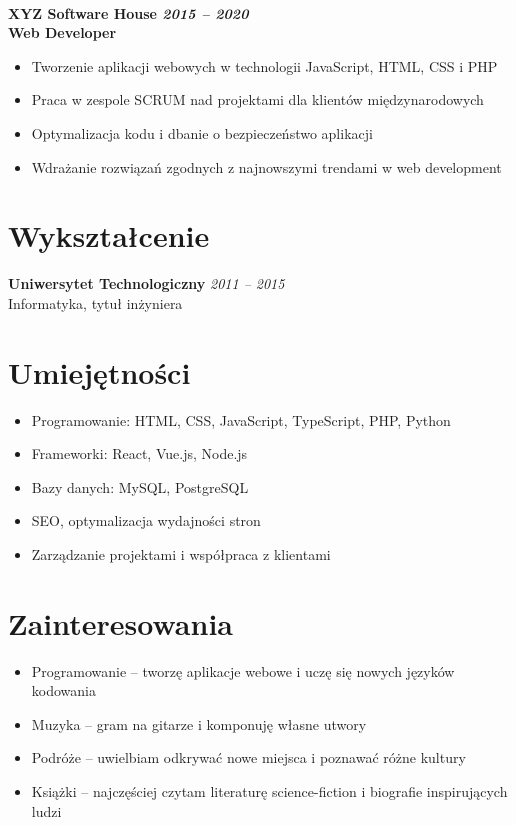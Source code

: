 \documentclass[a4paper,10pt]{article}
\begin{document}
 \\
\bf{XYZ Software House} \hfill \textit{2015 – 2020}\\
Web Developer
\begin{itemize}
    \item Tworzenie aplikacji webowych w technologii JavaScript, HTML, CSS i PHP
    \item Praca w zespole SCRUM nad projektami dla klientów międzynarodowych
    \item Optymalizacja kodu i dbanie o bezpieczeństwo aplikacji
    \item Wdrażanie rozwiązań zgodnych z najnowszymi trendami w web development
\end{itemize}

\section*{Wykształcenie}
\textbf{Uniwersytet Technologiczny} \hfill \textit{2011 – 2015}\\
Informatyka, tytuł inżyniera

\section*{Umiejętności}
\begin{itemize}
    \item Programowanie: HTML, CSS, JavaScript, TypeScript, PHP, Python
    \item Frameworki: React, Vue.js, Node.js
    \item Bazy danych: MySQL, PostgreSQL
    \item SEO, optymalizacja wydajności stron
    \item Zarządzanie projektami i współpraca z klientami
\end{itemize}

\section*{Zainteresowania}
\begin{itemize}
    \item Programowanie – tworzę aplikacje webowe i uczę się nowych języków kodowania
    \item Muzyka – gram na gitarze i komponuję własne utwory
    \item Podróże – uwielbiam odkrywać nowe miejsca i poznawać różne kultury
    \item Książki – najczęściej czytam literaturę science-fiction i biografie inspirujących ludzi
\end{itemize}
\end{document}
